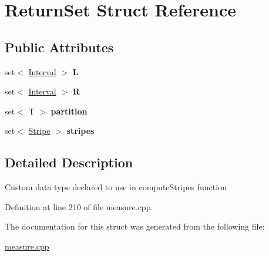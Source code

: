 \hypertarget{structReturnSet}{}\section{Return\+Set Struct Reference}
\label{structReturnSet}
\subsection*{Public Attributes}
\begin{DoxyCompactItemize}
\item 
\mbox{\label{structReturnSet_ab9ce4ee453dba93e604eeb9ec2a7c4ca}} 
set$<$ \hyperlink{classInterval}{Interval} $>$ {\bfseries L}
\item 
\mbox{\label{structReturnSet_a3cc53b19740f7fe7a37c70adde4e9de4}} 
set$<$ \hyperlink{classInterval}{Interval} $>$ {\bfseries R}
\item 
\mbox{\label{structReturnSet_ab3bdd96460f8085e2bf5cfca4bd3f465}} 
set$<$ T $>$ {\bfseries partition}
\item 
\mbox{\label{structReturnSet_a4ca97268f07773f481f9e0f446345e2d}} 
set$<$ \hyperlink{classStripe}{Stripe} $>$ {\bfseries stripes}
\end{DoxyCompactItemize}


\subsection{Detailed Description}
Custom data type declared to use in compute\+Stripes function 

Definition at line 210 of file measure.\+cpp.



The documentation for this struct was generated from the following file\+:\begin{DoxyCompactItemize}
\item 
\hyperlink{measure_8cpp}{measure.\+cpp}\end{DoxyCompactItemize}
